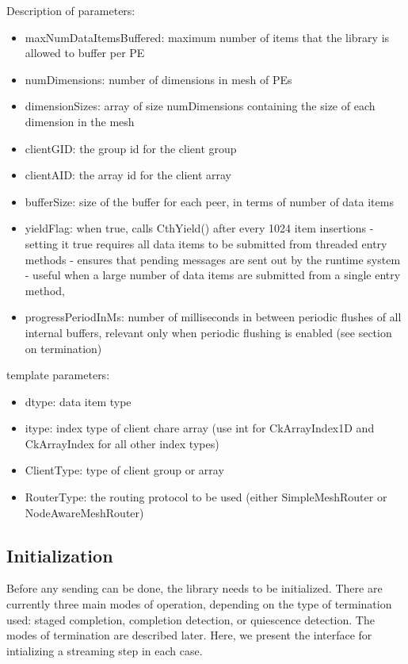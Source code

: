 Description of parameters:
\begin{itemize}
\item maxNumDataItemsBuffered: maximum number of items that the
  library is allowed to buffer per PE
\item numDimensions: number of dimensions in mesh of PEs
\item dimensionSizes: array of size numDimensions containing the size
  of each dimension in the mesh
\item clientGID: the group id for the client group
\item clientAID: the array id for the client array
\item bufferSize: size of the buffer for each peer,
  in terms of number of data items
\item yieldFlag: when true, calls CthYield() after every 1024 item
  insertions - setting it true requires all data items to be submitted
  from threaded entry methods - ensures that pending messages are sent
  out by the runtime system - useful when a large number of data items
  are submitted from a single entry method,
\item progressPeriodInMs: number of milliseconds in between periodic
  flushes of all internal buffers, relevant only when periodic
  flushing is enabled (see section on termination)
\end{itemize}

template parameters:
\begin{itemize}
\item dtype: data item type
\item itype: index type of client chare array (use int for
  CkArrayIndex1D and CkArrayIndex for all other index types)
\item ClientType: type of client group or array
\item RouterType: the routing protocol to be used (either SimpleMeshRouter or NodeAwareMeshRouter)
\end{itemize}

\subsection{Initialization}

Before any sending can be done, the library needs to be initialized. There are
currently three main modes of operation, depending on the type of termination
used: staged completion, completion detection, or quiescence detection. The
modes of termination are described later. Here, we present the interface for
intializing a streaming step in each case.

